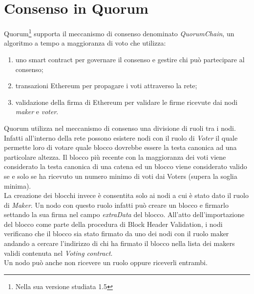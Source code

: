 \section{Consenso in Quorum}
%
Quorum\footnote{Nella sua versione studiata 1.5} supporta il meccanismo di consenso denominato \emph{QuorumChain}, un algoritmo a tempo a maggioranza di voto che utilizza:
\begin{enumerate}
	\item uno smart contract per governare il consenso e gestire chi può partecipare al consenso;
	\item transazioni Ethereum per propagare i voti attraverso la rete;
	\item validazione della firma di Ethereum per validare le firme ricevute dai nodi \emph{maker} e \emph{voter}.
\end{enumerate}%
Quorum utilizza nel meccanismo di consenso una divisione di ruoli tra i nodi. Infatti all'interno della rete possono esistere nodi con il ruolo di \emph{Voter} il quale permette loro di votare quale blocco dovrebbe essere la testa canonica ad una particolare altezza. Il blocco più recente con la maggioranza dei voti viene considerato la testa canonica di una catena ed un blocco viene considerato valido se e solo se ha ricevuto un numero minimo di voti dai Voters (supera la soglia minima). \\ 
La creazione dei blocchi invece è consentita solo ai nodi a cui è stato dato il ruolo di \emph{Maker}. Un nodo con questo ruolo infatti può creare un blocco e firmarlo settando la sua firma nel campo \emph{extraData} del blocco. All'atto dell'importazione del blocco come parte della procedura di Block Header Validation, i nodi verificano che il blocco sia stato firmato da uno dei nodi con il ruolo maker andando a cercare l'indirizzo di chi ha firmato il blocco nella lista dei makers validi contenuta nel \emph{Voting contract}. \\
Un nodo può anche non ricevere un ruolo oppure riceverli entrambi.%

